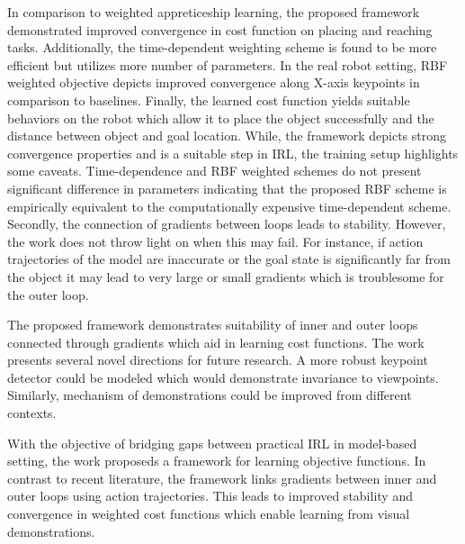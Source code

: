 \documentclass[11pt,letterpaper]{article}
\begin{document}
In comparison to weighted appreticeship learning, the proposed framework demonstrated improved convergence in cost function on placing and reaching tasks. Additionally, the time-dependent weighting scheme is found to be more efficient but utilizes more number of parameters. In the real robot setting, RBF weighted objective depicts improved convergence along X-axis keypoints in comparison to baselines. Finally, the learned cost function yields suitable behaviors on the robot which allow it to place the object successfully and the distance between object and goal location. While, the framework depicts strong convergence properties and is a suitable step in IRL, the training setup highlights some caveats. Time-dependence and RBF weighted schemes do not present significant difference in parameters indicating that the proposed RBF scheme is empirically equivalent to the computationally expensive time-dependent scheme. Secondly, the connection of gradients between loops leads to stability. However, the work does not throw light on when this may fail. For instance, if action trajectories of the model are inaccurate or the goal state is significantly far from the object it may lead to very large or small gradients which is troublesome for the outer loop.

The proposed framework demonstrates suitability of inner and outer loops connected through gradients which aid in learning cost functions. The work presents several novel directions for future research. A more robust keypoint detector could be modeled which would demonstrate invariance to viewpoints. Similarly, mechanism of demonstrations could be improved from different contexts. 

With the objective of bridging gaps between practical IRL in model-based setting, the work proposeds a framework for learning objective functions. In contrast to recent literature, the framework links gradients between inner and outer loops using action trajectories. This leads to improved stability and convergence in weighted cost functions which enable learning from visual demonstrations. 
\end{document}

